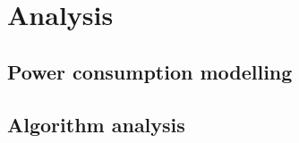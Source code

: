 \chapter{Analysis} \label{Chapter:Analysis}

\section{Power consumption modelling}

\section{Algorithm analysis}
